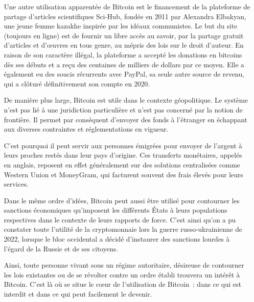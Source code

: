 Une autre utilisation apparentée de Bitcoin est le financement de la plateforme de partage d'articles scientifiques Sci-Hub, fondée en 2011 par Alexandra Elbakyan, une jeune femme kazakhe inspirée par les idéaux communistes. Le but du site (toujours en ligne) est de fournir un libre accès au savoir, par la partage gratuit d'articles et d'œuvres en tous genre, au mépris des lois sur le droit d'auteur. En raison de son caractère illégal, la plateforme a accepté les donations en bitcoins dès ses débuts et a reçu des centaines de milliers de dollars par ce moyen. Elle a également eu des soucis récurrents avec PayPal, sa seule autre source de revenu, qui a clôturé définitivement son compte en 2020.


De manière plus large, Bitcoin est utile dans le contexte géopolitique. Le système n'est pas lié à une juridiction particulière et n'est pas concerné par la notion de frontière. Il permet par conséquent d'envoyer des fonds à l'étranger en échappant aux diverses contraintes et réglementations en vigueur.

C'est pourquoi il peut servir aux personnes émigrées pour envoyer de l'argent à leurs proches restés dans leur pays d'origine. Ces transferts monétaires, appelés  en anglais, reposent en effet généralement sur des solutions centralisées comme Western Union et MoneyGram, qui facturent souvent des frais élevés pour leurs services. %

Dans le même ordre d'idées, Bitcoin peut aussi être utilisé pour contourner les sanctions économiques qu'imposent les différents États à leurs populations respectives dans le contexte de leurs rapports de force. C'est ainsi qu'on a pu constater toute l'utilité de la cryptomonnaie lors la guerre russo-ukrainienne de 2022, lorsque le bloc occidental a décidé d'instaurer des sanctions lourdes à l'égard de la Russie et de ses citoyens.

Ainsi, toute personne vivant sous un régime autoritaire, désireuse de contourner les lois existantes ou de se révolter contre un ordre établi trouvera un intérêt à Bitcoin. C'est là où se situe le cœur de l'utilisation de Bitcoin~: dans ce qui est interdit et dans ce qui peut facilement le devenir.

